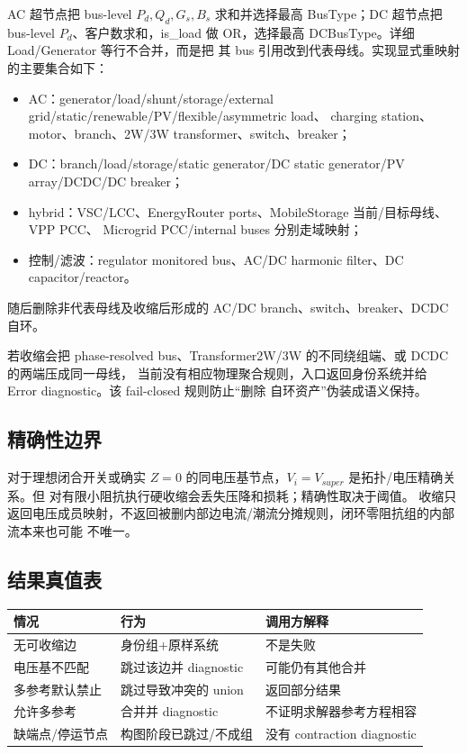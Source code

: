 AC 超节点把 bus-level $P_d,Q_d,G_s,B_s$ 求和并选择最高 BusType；DC 超节点把 bus-level
$P_d$、客户数求和，is\_load 做 OR，选择最高 DCBusType。详细 Load/Generator 等行不合并，而是把
其 bus 引用改到代表母线。实现显式重映射的主要集合如下：
\begin{itemize}
  \item AC：generator/load/shunt/storage/external grid/static/renewable/PV/flexible/asymmetric load、
        charging station、motor、branch、2W/3W transformer、switch、breaker；
  \item DC：branch/load/storage/static generator/DC static generator/PV array/DCDC/DC breaker；
  \item hybrid：VSC/LCC、EnergyRouter ports、MobileStorage 当前/目标母线、VPP PCC、
        Microgrid PCC/internal buses 分别走域映射；
  \item 控制/滤波：regulator monitored bus、AC/DC harmonic filter、DC capacitor/reactor。
\end{itemize}
随后删除非代表母线及收缩后形成的 AC/DC branch、switch、breaker、DCDC 自环。

若收缩会把 phase-resolved bus、Transformer2W/3W 的不同绕组端、或 DCDC 的两端压成同一母线，
当前没有相应物理聚合规则，入口返回身份系统并给 Error diagnostic。该 fail-closed 规则防止“删除
自环资产”伪装成语义保持。

\subsection{精确性边界}

对于理想闭合开关或确实 $Z=0$ 的同电压基节点，$V_i=V_{super}$ 是拓扑/电压精确关系。但
 对有限小阻抗执行硬收缩会丢失压降和损耗；精确性取决于阈值。
收缩只返回电压成员映射，不返回被删内部边电流/潮流分摊规则，闭环零阻抗组的内部流本来也可能
不唯一。

\subsection{结果真值表}

\begin{center}\small
\begin{tabular}{@{}L{4.0cm}L{3.0cm}L{7.0cm}@{}}
\toprule
情况 & 行为 & 调用方解释\\
\midrule
无可收缩边 & 身份组+原样系统 & 不是失败\\
电压基不匹配 & 跳过该边并 diagnostic & 可能仍有其他合并\\
多参考默认禁止 & 跳过导致冲突的 union & 返回部分结果\\
允许多参考 & 合并并 diagnostic & 不证明求解器参考方程相容\\
缺端点/停运节点 & 构图阶段已跳过/不成组 & 没有 contraction diagnostic\\
\bottomrule
\end{tabular}
\end{center}
